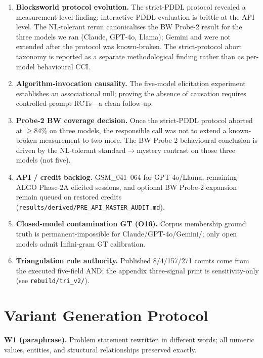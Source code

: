 \begin{enumerate}
  partial coverage. Section~\ref{sec:proximity}'s proximity-link observation
  is therefore one-model-strong by design; replicating on
  DeepSeek-R1~\citep{guo2025deepseek} or Qwen3 is the targeted next sweep.
  \item \textbf{Blocksworld protocol evolution.} The strict-PDDL protocol
  revealed a measurement-level finding: interactive PDDL evaluation is brittle
  at the API level. The NL-tolerant rerun canonicalises the BW Probe-2 result
  for the three models we ran (Claude, GPT-4o, Llama); Gemini and \omini{}
  were not extended after the protocol was known-broken. The strict-protocol
  abort taxonomy is reported as a separate methodological finding rather than
  as per-model behavioural CCI.
  \item \textbf{Algorithm-invocation causality.} The five-model elicitation
  experiment establishes an associational null; proving the absence of
  causation requires controlled-prompt RCTs---a clean follow-up.
  \item \textbf{Probe-2 BW coverage decision.} Once the strict-PDDL protocol
  aborted at $\geq 84\%$ on three models, the responsible call was not to
  extend a known-broken measurement to two more. The BW Probe-2 behavioural
  conclusion is driven by the NL-tolerant standard$\to$mystery contrast on
  those three models (not five).
  \item \textbf{API / credit backlog.} GSM\_041--064 for GPT-4o/Llama,
  remaining ALGO Phase-2A elicited sessions, and optional BW Probe-2
  expansion remain queued on restored credits
  (\texttt{results/derived/PRE\_API\_MASTER\_AUDIT.md}).
  \item \textbf{Closed-model contamination GT (O16).} Corpus membership
  ground truth is permanent-impossible for Claude/GPT-4o/Gemini/\omini{};
  only open models admit Infini-gram GT calibration.
  \item \textbf{Triangulation rule authority.} Published 8/4/157/271 counts
  come from the executed five-field AND; the appendix three-signal print is
  sensitivity-only (see \texttt{rebuild/tri\_v2/}).
\end{enumerate}

\section{Variant Generation Protocol}
\label{app:variants}

\textbf{W1 (paraphrase).} Problem statement rewritten in different words; all
numeric values, entities, and structural relationships preserved exactly.


